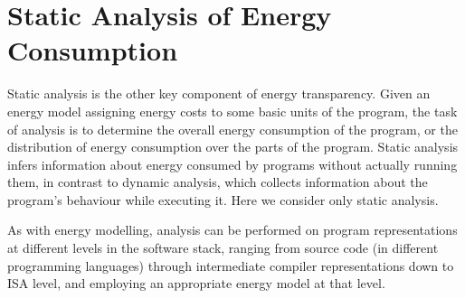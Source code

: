\documentclass[oneside]{book}
\begin{document}

 
%

\section{Static Analysis of Energy Consumption}\label{sec:energy-analysis}

Static analysis is the other key component of energy transparency.
Given an energy model assigning energy costs to some basic units of the program,
the task of analysis is to determine the overall energy consumption of the program, or
the distribution of energy consumption over the parts of the program.
Static analysis infers information about energy consumed by programs without
actually running them, in contrast to dynamic analysis, which collects information
about the program's behaviour while executing it.  Here we consider only static analysis.

As with energy modelling, analysis can be performed on
program representations at different levels 
in the software stack, ranging from source code (in different programming
languages) through intermediate compiler representations down to ISA level, and employing
an appropriate energy model at that level.
\end{document}
